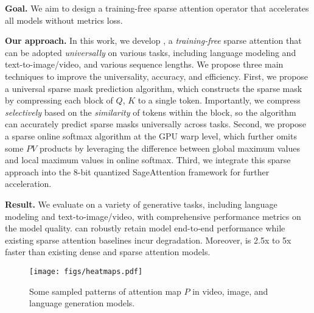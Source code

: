 \textbf{Goal.} We aim to design a training-free sparse attention operator that accelerates all models without metrics loss.

\textbf{Our approach.} In this work, we develop \our, a \emph{training-free} sparse attention that can be adopted \emph{universally} on various tasks, including language modeling and text-to-image/video, and various sequence lengths. 
We propose three main techniques to improve the universality, accuracy, and efficiency. 
First, we propose a universal sparse mask prediction algorithm, which constructs the sparse mask by compressing each block of $Q$, $K$ to a single token.
Importantly, we compress \emph{selectively} based on the \emph{similarity} of tokens within the block, so the algorithm can accurately predict sparse masks universally across tasks.
Second, we propose a sparse online softmax algorithm at the GPU warp level, which further omits some $PV$ products by leveraging the difference between global maximum values and local maximum values in online softmax.
Third, we integrate this sparse approach into the 8-bit quantized SageAttention framework for further acceleration. 


\textbf{Result.} We evaluate \our on a variety of generative tasks, including language modeling and text-to-image/video, with comprehensive performance metrics on the model quality. 
\our can robustly retain model end-to-end performance while existing sparse attention baselines incur degradation. Moreover, \our is 2.5x to 5x faster than existing dense and sparse attention models. 



\begin{figure}[!t]
    \centering
    \texttt{[image: figs/heatmaps.pdf]}
    \vspace{-.25em}
    \caption{Some sampled patterns of attention map $P$ in video, image, and language generation models.}
    \vspace{-1.8em}
    \label{fig:heatmap}
\end{figure}

